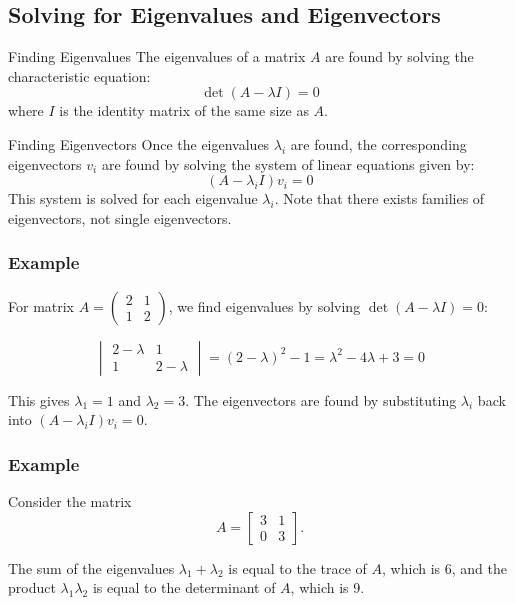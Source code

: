 \subsection{Solving for Eigenvalues and Eigenvectors}
\begin{definitionbox}{Finding Eigenvalues}
The eigenvalues of a matrix $A$ are found by solving the characteristic equation:
\[
\det(A - \lambda I) = 0
\]
where $I$ is the identity matrix of the same size as $A$.
\end{definitionbox}

\begin{definitionbox}{Finding Eigenvectors}
Once the eigenvalues $\lambda_i$ are found, the corresponding eigenvectors $v_i$ are found by solving the system of linear equations given by:
\[
(A - \lambda_i I)v_i = 0
\]
This system is solved for each eigenvalue $\lambda_i$. Note that there exists families of eigenvectors, not single eigenvectors.
\end{definitionbox}

\subsubsection*{Example}
For matrix $A = \begin{pmatrix}
2 & 1 \\
1 & 2
\end{pmatrix}$, we find eigenvalues by solving $\det(A - \lambda I) = 0$:

\[
\begin{vmatrix}
2 - \lambda & 1 \\
1 & 2 - \lambda
\end{vmatrix} = (2-\lambda)^2 - 1 = \lambda^2 - 4\lambda + 3 = 0
\]

This gives $\lambda_1 = 1$ and $\lambda_2 = 3$. The eigenvectors are found by substituting $\lambda_i$ back into $(A - \lambda_i I)v_i = 0$.

\subsubsection*{Example}
Consider the matrix 
\[ A = \begin{bmatrix}
3 & 1 \\
0 & 3
\end{bmatrix}. \]

The sum of the eigenvalues \( \lambda_1 + \lambda_2 \) is equal to the trace of \( A \), which is 6, and the product \( \lambda_1 \lambda_2 \) is equal to the determinant of \( A \), which is 9.

